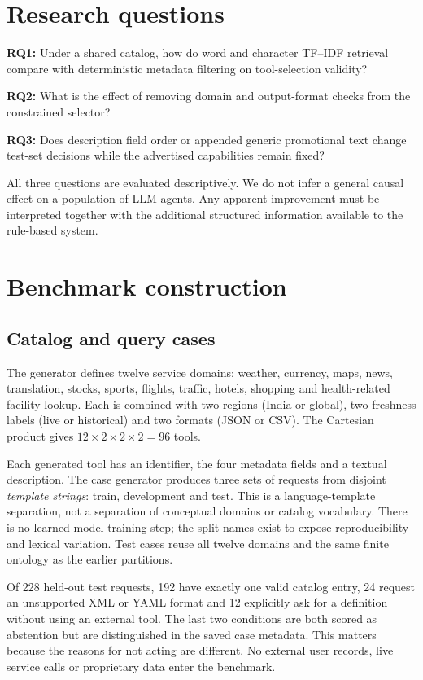 \documentclass[10pt,a4paper]{article}
\begin{document}
\section{Research questions}
\textbf{RQ1:} Under a shared catalog, how do word and character TF--IDF retrieval compare with deterministic metadata filtering on tool-selection validity?

\textbf{RQ2:} What is the effect of removing domain and output-format checks from the constrained selector?

\textbf{RQ3:} Does description field order or appended generic promotional text change test-set decisions while the advertised capabilities remain fixed?

All three questions are evaluated descriptively. We do not infer a general causal effect on a population of LLM agents. Any apparent improvement must be interpreted together with the additional structured information available to the rule-based system.

\section{Benchmark construction}
\subsection{Catalog and query cases}
The generator defines twelve service domains: weather, currency, maps, news, translation, stocks, sports, flights, traffic, hotels, shopping and health-related facility lookup. Each is combined with two regions (India or global), two freshness labels (live or historical) and two formats (JSON or CSV). The Cartesian product gives $12\times2\times2\times2=96$ tools.

Each generated tool has an identifier, the four metadata fields and a textual description. The case generator produces three sets of requests from disjoint \emph{template strings}: train, development and test. This is a language-template separation, not a separation of conceptual domains or catalog vocabulary. There is no learned model training step; the split names exist to expose reproducibility and lexical variation. Test cases reuse all twelve domains and the same finite ontology as the earlier partitions.

Of 228 held-out test requests, 192 have exactly one valid catalog entry, 24 request an unsupported XML or YAML format and 12 explicitly ask for a definition without using an external tool. The last two conditions are both scored as abstention but are distinguished in the saved case metadata. This matters because the reasons for not acting are different. No external user records, live service calls or proprietary data enter the benchmark.
\end{document}
